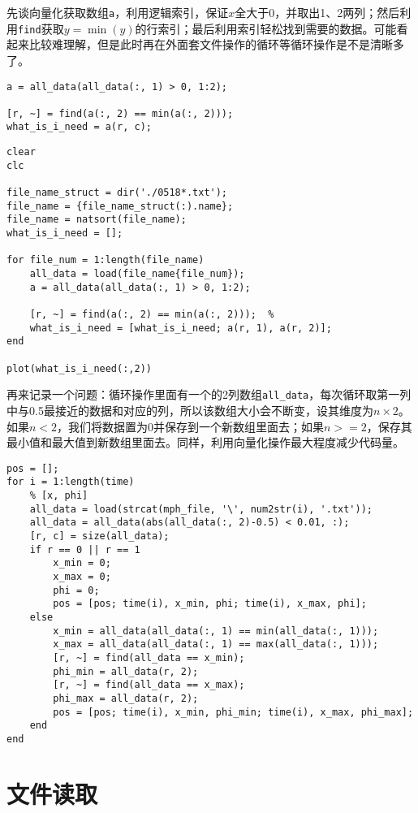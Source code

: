 先谈向量化获取数组\texttt{a}，利用逻辑索引，保证$ x $全大于0，并取出1、2两列；然后利用\texttt{find}获取$ y=\min(y) $的行索引；最后利用索引轻松找到需要的数据。可能看起来比较难理解，但是此时再在外面套文件操作的循环等循环操作是不是清晰多了。

\begin{verbatim}
a = all_data(all_data(:, 1) > 0, 1:2);

[r, ~] = find(a(:, 2) == min(a(:, 2)));
what_is_i_need = a(r, c);
\end{verbatim}

\begin{verbatim}
clear
clc

file_name_struct = dir('./0518*.txt');
file_name = {file_name_struct(:).name};
file_name = natsort(file_name);
what_is_i_need = [];

for file_num = 1:length(file_name)
    all_data = load(file_name{file_num});
    a = all_data(all_data(:, 1) > 0, 1:2);
    
    [r, ~] = find(a(:, 2) == min(a(:, 2)));  % 
    what_is_i_need = [what_is_i_need; a(r, 1), a(r, 2)];
end

plot(what_is_i_need(:,2))
\end{verbatim}

再来记录一个问题：循环操作里面有一个的2列数组\texttt{all_data}，每次循环取第一列中与0.5最接近的数据和对应的列，所以该数组大小会不断变，设其维度为$ n\times 2 $。如果$ n<2 $，我们将数据置为0并保存到一个新数组里面去；如果$ n>=2 $，保存其最小值和最大值到新数组里面去。同样，利用向量化操作最大程度减少代码量。

\begin{verbatim}
pos = [];
for i = 1:length(time)
    % [x, phi]
    all_data = load(strcat(mph_file, '\', num2str(i), '.txt'));
    all_data = all_data(abs(all_data(:, 2)-0.5) < 0.01, :);
    [r, c] = size(all_data);
    if r == 0 || r == 1
        x_min = 0;
        x_max = 0;
        phi = 0;
        pos = [pos; time(i), x_min, phi; time(i), x_max, phi];
    else
        x_min = all_data(all_data(:, 1) == min(all_data(:, 1)));
        x_max = all_data(all_data(:, 1) == max(all_data(:, 1)));
        [r, ~] = find(all_data == x_min);
        phi_min = all_data(r, 2);
        [r, ~] = find(all_data == x_max);
        phi_max = all_data(r, 2);
        pos = [pos; time(i), x_min, phi_min; time(i), x_max, phi_max];
    end
end
\end{verbatim}

\section{文件读取}

